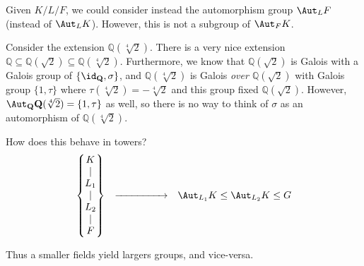 \begin{warning}
Given $K/L/F$, we could consider instead the automorphism group $\Aut_L F$ (instead of $\Aut_L K$). However, this is not a subgroup of $\Aut_F K$. \\

\begin{example}
Consider the extension $\mathbb{Q}(\sqrt[4]{2})$. There is a very nice extension $\mathbb{Q} \subseteq \mathbb{Q}(\sqrt{2}) \subseteq \mathbb{Q}(\sqrt[4]{2})$. Furthermore, we know that $\mathbb{Q}(\sqrt{2})$ is Galois with a Galois group of $\{\id_\mathbb{Q}, \sigma\}$, and $\mathbb{Q}(\sqrt[4]{2})$ is Galois \emph{over $\mathbb{Q}(\sqrt{2})$} with Galois group $\{1, \tau\}$ where $\tau(\sqrt[4]{2}) = -\sqrt[4]{2}$ and this group fixed $\mathbb{Q}(\sqrt{2})$. However, $\Aut_{\mathbb{Q}} \mathbb{Q}(\sqrt[4]{2}) = \{1, \tau\}$ as well, so there is no way to think of $\sigma$ as an automorphism of $\mathbb{Q}(\sqrt[4]{2})$.
\end{example}
\end{warning}

\begin{question}
How does this behave in towers?
\[
	\begin{matrix}
	\left\{ \begin{matrix}
		K \\ \mid \\ L_1 \\ \mid \\ L_2 \\ \mid \\ F
	\end{matrix} \right\}
	 & {\xrightarrow{\hphantom{looooooooong}}} & \Aut_{L_1} K \leq \Aut_{L_2} K \leq G
	\end{matrix}
\]

Thus a smaller fields yield largers groups, and vice-versa.
\end{question}

